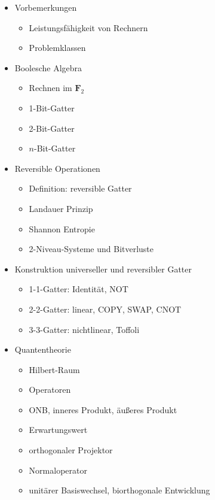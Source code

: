 \documentclass[9pt]{article}
\begin{document}
  \begin{multicols}{2}
    \begin{itemize}
      \item{
        Vorbemerkungen
        \begin{itemize}
          \item Leistungsfähigkeit von Rechnern
          \item Problemklassen
        \end{itemize}
      }
      \item{
        Boolesche Algebra
        \begin{itemize}
          \item Rechnen im $\mathbf{F}_2$
          \item 1-Bit-Gatter
          \item 2-Bit-Gatter
          \item $n$-Bit-Gatter
        \end{itemize}
      }
      \item Reversible Operationen
        \begin{itemize}
          \item Definition: reversible Gatter
          \item Landauer Prinzip
          \item Shannon Entropie
          \item 2-Niveau-Systeme und Bitverluste
        \end{itemize}
      \item Konstruktion universeller und reversibler Gatter
        \begin{itemize}
          \item 1-1-Gatter: Identität, NOT
          \item 2-2-Gatter: linear, COPY, SWAP, CNOT
          \item 3-3-Gatter: nichtlinear, Toffoli
        \end{itemize}
      \item Quantentheorie
        \begin{itemize}
          \item Hilbert-Raum
          \item Operatoren
          \item ONB, inneres Produkt, äußeres Produkt
          \item Erwartungswert
          \item orthogonaler Projektor
          \item Normaloperator
          \item unitärer Basiswechsel, biorthogonale Entwicklung

\end{itemize}
\end{itemize}
\end{multicols}
\end{document}
